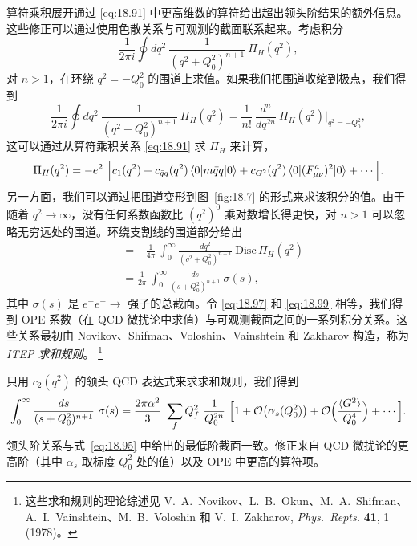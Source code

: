 算符乘积展开通过 \eqref{eq:18.91} 中更高维数的算符给出超出领头阶结果的额外信息。这些修正可以通过使用色散关系与可观测的截面联系起来。考虑积分
\begin{equation}
  \frac{1}{2\pi i}\oint dq^2\ \frac{1}{(q^2+Q_0^2)^{n+1}}\ \Pi_H(q^2) ,
  \label{eq:18.97}
\end{equation}
对 $n > 1$，在环绕 $q^2 = -Q_0^2$ 的围道上求值。如果我们把围道收缩到极点，我们得到
\begin{equation}
  \frac{1}{2\pi i}\oint dq^2\ \frac{1}{(q^2+Q_0^2)^{n+1}}\ \Pi_H(q^2)
  = \frac{1}{n!}\ \frac{d^n}{dq^{2n}}\ \Pi_H(q^2)\Big|_{q^2=-Q_0^2} ,
\end{equation}
这可以通过从算符乘积关系 \eqref{eq:18.91} 求 $\Pi_H$ 来计算，
\begin{equation}
  \Pi_H(q^2) = -e^2\ \Bigl[ c_1(q^2) + c_{\bar{q}q}(q^2)\,
    \langle 0|m\bar{q}q|0\rangle + c_{G^2}(q^2)\,
      \langle 0|(F^a_{\mu\nu})^2|0\rangle + \cdots \Bigr] .
  \label{eq:18.98}
\end{equation}
另一方面，我们可以通过把围道变形到图~\ref{fig:18.7} 的形式来求该积分的值。由于随着 $q^2\to\infty$，没有任何系数函数比 $(q^2)^0$ 乘对数增长得更快，对 $n > 1$ 可以忽略无穷远处的围道。环绕支割线的围道部分给出
\begin{equation}
  \begin{aligned}
    &= -\frac{1}{4\pi}\ \int_0^{\infty} \frac{dq^2}{(q^2+Q_0^2)^{n+1}}\
      \mathrm{Disc}\,\Pi_H(q^2)\\
    &= \frac{1}{2\pi}\ \int_0^{\infty} \frac{ds}{(s+Q_0^2)^{n+1}}\
      \sigma(s) ,
  \end{aligned}
  \label{eq:18.99}
\end{equation}
其中 $\sigma(s)$ 是 $e^{+}e^{-}\to$ 强子的总截面。令 \eqref{eq:18.97} 和 \eqref{eq:18.99} 相等，我们得到 OPE 系数（在 QCD 微扰论中求值）与可观测截面之间的一系列积分关系。这些关系最初由 Novikov、Shifman、Voloshin、Vainshtein 和 Zakharov 构造，称为\emph{ITEP 求和规则}。%
\footnote{这些求和规则的理论综述见 V.~A.~Novikov、L.~B.~Okun、M.~A.~Shifman、A.~I.~Vainshtein、M.~B.~Voloshin 和 V.~I.~Zakharov, \emph{Phys.\ Repts.} \textbf{41}, 1 (1978)。}

只用 $c_2(q^2)$ 的领头 QCD 表达式来求求和规则，我们得到
\begin{equation}
  \int_0^{\infty} \frac{ds}{(s+Q_0^2)^{n+1}}\ \sigma(s)
  = \frac{2\pi\alpha^2}{3}\ \sum_f Q_f^2\ \frac{1}{Q_0^{2n}}\ \Bigl[ 1 +
    \mathcal{O}\bigl( \alpha_s(Q_0^2) \bigr) + \mathcal{O}\Bigl(
      \frac{\langle G^2\rangle}{Q_0^4} \Bigr) + \cdots \Bigr] .
  \label{eq:18.100}
\end{equation}
领头阶关系与式~\eqref{eq:18.95} 中给出的最低阶截面一致。修正来自 QCD 微扰论的更高阶（其中 $\alpha_s$ 取标度 $Q_0^2$ 处的值）以及 OPE 中更高的算符项。

